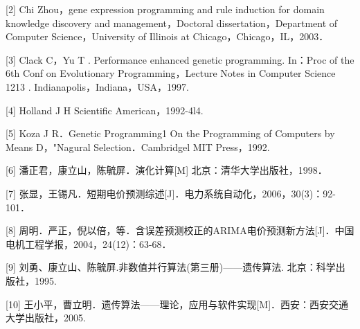 \documentclass[UTF8]{ctexart}
\begin{document}
[2] Chi Zhou，gene expression programming and rule induction for domain knowledge discovery and management，Doctoral dissertation，Department of Computer Science，University of Illinois at Chicago，Chicago，IL，2003．

[3] Clack C，Yu T . Performance enhanced genetic programming. In：Proc of the 6th Conf on Evolutionary Programming，Lecture Notes in Computer Science 1213 . Indianapolis，Indiana，USA，1997.

[4] Holland J H Scientific American，1992-4l4.

[5] Koza J R．Genetic Programming1 On the Programming of Computers by Means D，"Nagural Selection．Cambridgel MIT Press，1992.

[6] 潘正君，康立山，陈毓屏．演化计算[M] 北京：清华大学出版社，1998．

[7] 张显，王锡凡．短期电价预测综述[J]．电力系统自动化，2006，30(3)：92-101．

[8] 周明．严正，倪以倍，等．含误差预测校正的ARIMA电价预测新方法[J]．中国电机工程学报，2004，24(12)：63-68．

[9] 刘勇、康立山、陈毓屏.非数值并行算法(第三册)——遗传算法. 北京：科学出版社，1995.

[10] 王小平，曹立明．遗传算法——理论，应用与软件实现[M]．西安：西安交通大学出版社，2005.
\end{document}

